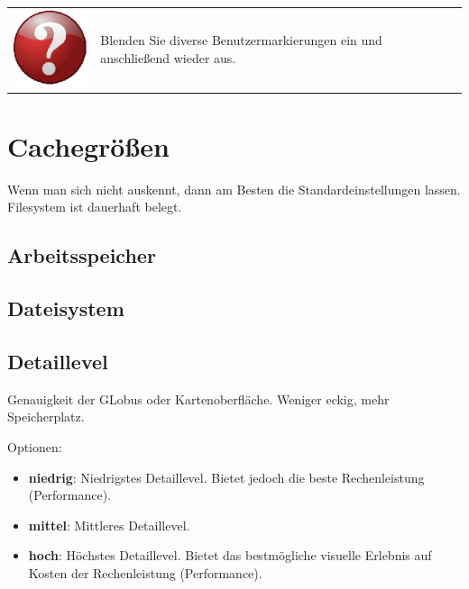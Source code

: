 \documentclass[10pt]{scrreprt}
\begin{document}
\vspace{3mm}
\begin{tabular}{>{\centering \arraybackslash}m{1cm} m{14cm}}
\includegraphics[scale=0.5]{images/quest.eps} & Blenden Sie diverse Benutzermarkierungen ein und anschließend wieder aus.
\end{tabular}





\vspace{3mm}
\section{Cachegrößen} 

Wenn man sich nicht auskennt, dann am Besten die Standardeinstellungen lassen.
Filesystem ist dauerhaft belegt.


\vspace{3mm}
\subsection{Arbeitsspeicher}  

\vspace{3mm}
\subsection{Dateisystem}  



\vspace{3mm}
\subsection{Detaillevel}  
Genauigkeit der GLobus oder Kartenoberfläche. Weniger eckig, mehr Speicherplatz.

Optionen:
\begin{itemize}
\item \textbf{niedrig}: Niedrigstes Detaillevel. Bietet jedoch die beste Rechenleistung (Performance).
\item \textbf{mittel}: Mittleres Detaillevel.
\item \textbf{hoch}: Höchstes Detaillevel. Bietet das bestmögliche visuelle Erlebnis auf Kosten der Rechenleistung (Performance).
\end{itemize}
\end{document}
